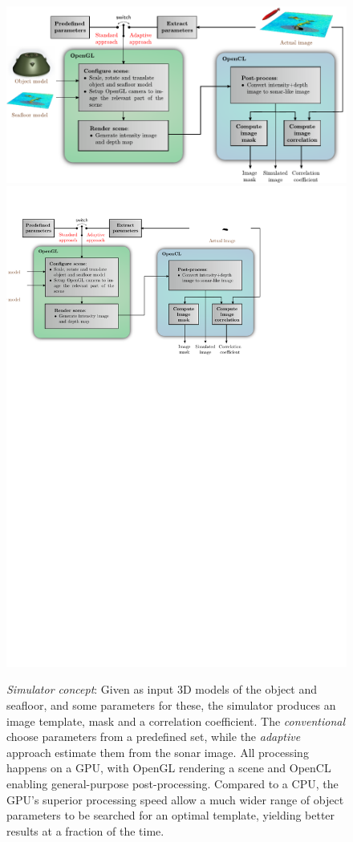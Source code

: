\begin{figure}[t]\centering%
\ifOverLeaf%
  \includegraphics[width=\linewidth]{gfx/simulator.pdf}%
\else
  \includegraphics[drawing,width=\linewidth]{gfx/simulator.svg}%
\fi
\caption{\emph{Simulator concept}: Given as input 3D models of the object and seafloor, and some parameters for these, the simulator produces an image template, mask and a correlation coefficient. The \emph{conventional} choose parameters from a predefined set, while the \emph{adaptive} approach estimate them from the sonar image. All processing happens on a GPU, with OpenGL rendering a scene and OpenCL enabling general-purpose post-processing. Compared to a CPU, the GPU's superior processing speed allow a much wider range of object parameters to be searched for an optimal template, yielding better results at a fraction of the time.}\label{IV_buildup}%
\end{figure}

